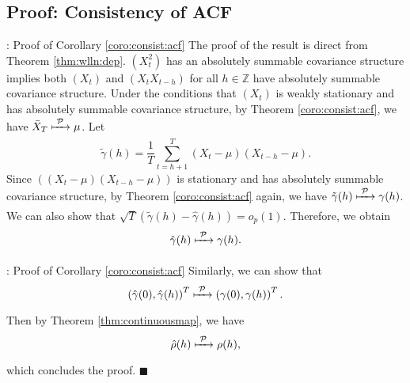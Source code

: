 \documentclass[envcountsect,usenames,dvipsnames]{beamer}
\theoremstyle{mystyle}
\begin{document}
\subsection{Proof: Consistency of ACF}
\label{proof:consit:acf}

\begin{frame}{\thesubsection: Proof of Corollary \ref{coro:consist:acf}}
\small
    The proof of the result is direct from Theorem \ref{thm:wlln:dep}. $(X_t^2)$ has an absolutely summable covariance structure implies both $(X_t)$ and $(X_tX_{t-h})$ for all $h \in \mathbb{Z}$ have absolutely summable covariance structure. Under the conditions that $(X_t)$ is weakly stationary and has absolutely summable covariance structure, by Theorem \ref{coro:consist:acf}, we have $\bar{X}_T \xmapsto[\;\;\;\;\; ]{\mathcal{P}} \mu$. Let
    \begin{equation*}
			\tilde{\gamma}(h) = \frac{1}{T} \sum_{t = h+1}^{T} \left(X_{t} - \mu\right) \left(X_{t-h} - \mu\right).
	\end{equation*}
	Since $(\left(X_{t} - \mu\right) \left(X_{t-h} - \mu\right))$ is stationary and has absolutely summable covariance structure, by Theorem \ref{coro:consist:acf} again, we have $\tilde{\gamma}(h) \xmapsto[\;\;\;\;\; ]{\mathcal{P}} \gamma(h)$. We can also show that $\sqrt{T} \left(\tilde{\gamma}(h) - \hat{\gamma}(h)  \right) = o_p(1)$. Therefore, we obtain
	\begin{equation*}
			\hat{\gamma}(h) \xmapsto[\;\;\;\;\; ]{\mathcal{P}} \gamma(h).
	\end{equation*}
\end{frame}

\begin{frame}{\thesubsection: Proof of Corollary \ref{coro:consist:acf}}
\small
Similarly, we can show that 
	\begin{equation*}
	\left( \hat{\gamma}(0), \hat{\gamma}(h) \right)^T \xmapsto[\;\;\;\;\; ]{\mathcal{P}} \left( \gamma(0), \gamma(h) \right)^T.
	\end{equation*}
	Then by Theorem \ref{thm:continuousmap}, we have
	\begin{equation*}
			\hat{\rho}(h) \xmapsto[\;\;\;\;\; ]{\mathcal{P}} \rho(h),
	\end{equation*}
	which concludes the proof.  \hfill $\blacksquare$
	
	\vspace{0.5cm}
	
	\hyperlink{coro:consist:acf}{}
	
\end{frame}
\end{document}
